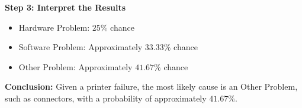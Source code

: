 \begin{solution}
\textbf{Step 3: Interpret the Results}
\begin{itemize}
    \item Hardware Problem: $25 \%$ chance
    \item Software Problem: Approximately $33.33 \%$ chance
    \item Other Problem: Approximately $41.67 \%$ chance
\end{itemize}

\textbf{Conclusion:} Given a printer failure, the most likely cause is an Other Problem, such as connectors, with a probability of approximately $41.67 \%$.


\end{solution}
